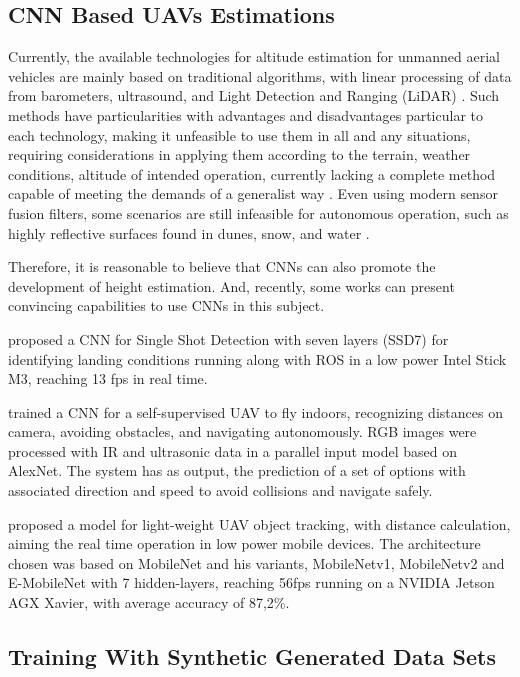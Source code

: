     \subsection{CNN Based UAVs Estimations}
    Currently, the available technologies for altitude estimation for unmanned aerial vehicles are mainly based on traditional algorithms, with linear processing of data from barometers, ultrasound, and Light Detection and Ranging (LiDAR) \cite{MonocularDepth}. 
    Such methods have particularities with advantages and disadvantages particular to each technology, making it unfeasible to use them in all and any situations, requiring considerations in applying them according to the terrain, weather conditions, altitude of intended operation, currently lacking a complete method capable of meeting the demands of a generalist way \cite{FiltroKalmanAltitude}. 
    Even using modern sensor fusion filters, some scenarios are still infeasible for autonomous operation, such as highly reflective surfaces found in dunes, snow, and water \cite{WeatherConstraints}.
    
    Therefore, it is reasonable to believe that CNNs can also promote the development of height estimation.
    And, recently, some works can present convincing capabilities to use CNNs in this subject. 

    \cite{OnboardCNN} proposed a CNN for Single Shot Detection with seven layers (SSD7) for identifying landing conditions running along with ROS in a low power Intel Stick M3, reaching 13 fps in real time. 

    \cite{ByMySelf} trained a CNN for a self-supervised UAV to fly indoors, recognizing distances on camera, avoiding obstacles, and navigating autonomously. RGB images were processed with IR and ultrasonic data in a parallel input model based on AlexNet. The system has as output, the prediction of a set of options with associated direction and speed to avoid collisions and navigate safely.

    \cite{MobileNetTracking} proposed a model for light-weight UAV object tracking, with distance calculation, aiming the real time operation in low power mobile devices.
    The architecture chosen was based on MobileNet and his variants, MobileNetv1, MobileNetv2 and E-MobileNet with 7 hidden-layers, reaching 56fps running on a NVIDIA Jetson AGX Xavier, with average accuracy of 87,2\%.
    
    \subsection{Training With Synthetic Generated Data Sets}
    

